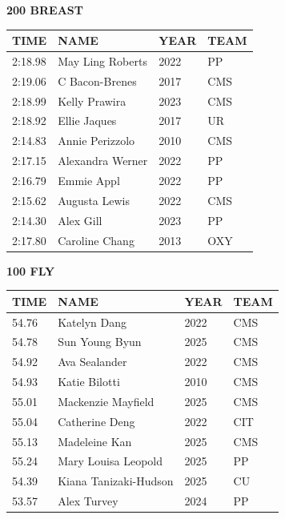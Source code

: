 \begin{table}[H]
\centering
\begin{minipage}[t]{0.48\textwidth}
\centering
\textbf{200 BREAST}\\[0.1cm]
\begin{tabular}{@{}p{1.8cm}p{2.8cm}p{1.2cm}p{1.4cm}@{}}
\hline
    \textbf{TIME} & \textbf{NAME} & \textbf{YEAR} & \textbf{TEAM} \\
\hline
    2:18.98 & May Ling Roberts & 2022 & PP \\
    2:19.06 & C Bacon-Brenes & 2017 & CMS \\
    2:18.99 & Kelly Prawira & 2023 & CMS \\
    2:18.92 & Ellie Jaques & 2017 & UR \\
    2:14.83 & Annie Perizzolo & 2010 & CMS \\
    2:17.15 & Alexandra Werner & 2022 & PP \\
    2:16.79 & Emmie Appl & 2022 & PP \\
    2:15.62 & Augusta Lewis & 2022 & CMS \\
    2:14.30 & Alex Gill & 2023 & PP \\
    2:17.80 & Caroline Chang & 2013 & OXY \\
\hline
\end{tabular}
\end{minipage}\hfill
\begin{minipage}[t]{0.48\textwidth}
\centering
\textbf{100 FLY}\\[0.1cm]
\begin{tabular}{@{}p{1.8cm}p{2.8cm}p{1.2cm}p{1.4cm}@{}}
\hline
    \textbf{TIME} & \textbf{NAME} & \textbf{YEAR} & \textbf{TEAM} \\
\hline
    54.76 & Katelyn Dang & 2022 & CMS \\
    54.78 & Sun Young Byun & 2025 & CMS \\
    54.92 & Ava Sealander & 2022 & CMS \\
    54.93 & Katie Bilotti & 2010 & CMS \\
    55.01 & Mackenzie Mayfield & 2025 & CMS \\
    55.04 & Catherine Deng & 2022 & CIT \\
    55.13 & Madeleine Kan & 2025 & CMS \\
    55.24 & Mary Louisa Leopold & 2025 & PP \\
    54.39 & Kiana Tanizaki-Hudson & 2025 & CU \\
    53.57 & Alex Turvey & 2024 & PP \\
\hline
\end{tabular}
\end{minipage}
\end{table}


